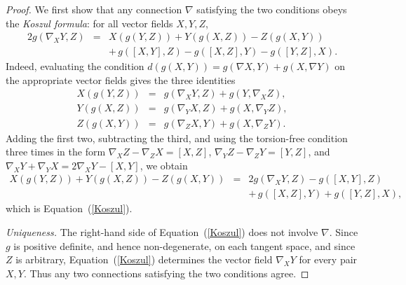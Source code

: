 \begin{proof}
\leanok
We first show that any connection $\nabla$ satisfying the two
conditions obeys the \emph{Koszul formula}: for all vector fields
$X,Y,Z$,
\begin{eqnarray}\label{Koszul}
2g(\nabla_XY,Z) & = & X(g(Y,Z))+Y(g(X,Z))-Z(g(X,Y)) \\
& & +\, g([X,Y],Z)-g([X,Z],Y)-g([Y,Z],X). \nonumber
\end{eqnarray}
Indeed, evaluating the condition $d(g(X,Y))=g(\nabla X,Y)+g(X,\nabla
Y)$ on the appropriate vector fields gives the three identities
\begin{eqnarray*}
X(g(Y,Z)) & = & g(\nabla_XY,Z)+g(Y,\nabla_XZ),\\
Y(g(X,Z)) & = & g(\nabla_YX,Z)+g(X,\nabla_YZ),\\
Z(g(X,Y)) & = & g(\nabla_ZX,Y)+g(X,\nabla_ZY).
\end{eqnarray*}
Adding the first two, subtracting the third, and using the
torsion-free condition three times in the form $\nabla_XZ-\nabla_ZX =
[X,Z]$, $\nabla_YZ-\nabla_ZY=[Y,Z]$, and $\nabla_XY+\nabla_YX =
2\nabla_XY-[X,Y]$, we obtain
\begin{eqnarray*}
X(g(Y,Z))+Y(g(X,Z))-Z(g(X,Y)) & = &
2g(\nabla_XY,Z)-g([X,Y],Z)\\
& & +\,g([X,Z],Y)+g([Y,Z],X),
\end{eqnarray*}
which is Equation~(\ref{Koszul}).

\emph{Uniqueness.} The right-hand side of
Equation~(\ref{Koszul}) does not involve $\nabla$. Since $g$ is
positive definite, and hence non-degenerate, on each tangent space,
and since $Z$ is arbitrary, Equation~(\ref{Koszul}) determines the
vector field $\nabla_XY$ for every pair $X,Y$. Thus any two
connections satisfying the two conditions agree.


\end{proof}
